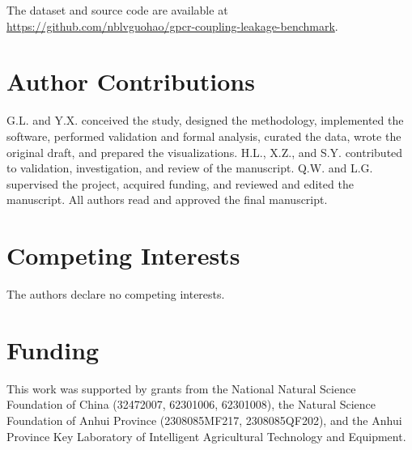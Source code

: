 \documentclass[11pt,a4paper]{article}
\begin{document}
The dataset and source code are available at \url{https://github.com/nblvguohao/gpcr-coupling-leakage-benchmark}.

\section*{Author Contributions}

G.L. and Y.X. conceived the study, designed the methodology, implemented the software, performed validation and formal analysis, curated the data, wrote the original draft, and prepared the visualizations. H.L., X.Z., and S.Y. contributed to validation, investigation, and review of the manuscript. Q.W. and L.G. supervised the project, acquired funding, and reviewed and edited the manuscript. All authors read and approved the final manuscript.

\section*{Competing Interests}

The authors declare no competing interests.

\section*{Funding}

This work was supported by grants from the National Natural Science Foundation of China (32472007, 62301006, 62301008), the Natural Science Foundation of Anhui Province (2308085MF217, 2308085QF202), and the Anhui Province Key Laboratory of Intelligent Agricultural Technology and Equipment.
\end{document}
